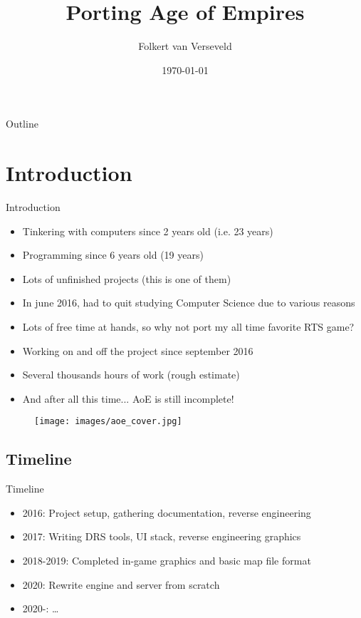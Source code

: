 \documentclass{beamer}
\title[Preserving and opensourcing RTS video games]{Porting Age of Empires}
\author{Folkert van Verseveld}
\institute{University of Amsterdam}
\date{\today}
\begin{document}

\begin{frame}
  \titlepage
\end{frame}

\begin{frame}{Outline}
	\tableofcontents
\end{frame}


\section{Introduction}

\begin{frame}{Introduction}
	\begin{itemize}
		\item Tinkering with computers since 2 years old (i.e. 23 years)
		\item Programming since 6 years old (19 years)
		\item Lots of unfinished projects (this is one of them)
		\item In june 2016, had to quit studying Computer Science due to various reasons
		\item Lots of free time at hands, so why not port my all time favorite RTS game?
		\item Working on and off the project since september 2016
		\item Several thousands hours of work (rough estimate)
		\item And after all this time... AoE is still incomplete!
	\end{itemize}
\end{frame}


\begin{frame}
	\begin{figure}
	\texttt{[image: images/aoe\_cover.jpg]}
	\end{figure}

\end{frame}


\subsection{Timeline}

\begin{frame}{Timeline}
	\begin{itemize}
		\item 2016: Project setup, gathering documentation, reverse engineering
		\item 2017: Writing DRS tools, UI stack, reverse engineering graphics
		\item 2018-2019: Completed in-game graphics and basic map file format
		\item 2020: Rewrite engine and server from scratch
		\item 2020-: \dots
	\end{itemize}
\end{frame}
\end{document}
